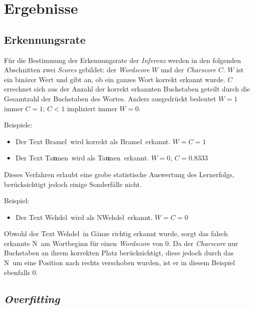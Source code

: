 \section{Ergebnisse}
\label{ergebnisse}

\subsection{Erkennungsrate}
\label{ergebnisse:erfolg}

Für die Bestimmung der Erkennungsrate der \textit{Inferenz} werden in den folgenden Abschnitten zwei \textit{Scores}
gebildet: der \textit{Wordscore} $W$ und der \textit{Charscore} $C$. $W$ ist ein binärer Wert und gibt an, ob ein ganzes
Wort korrekt erkannt wurde. $C$ errechnet sich aus der Anzahl der korrekt erkannten Buchstaben geteilt durch die
Gesamtzahl der Buchstaben des Wortes. Anders ausgedrückt bedeutet $W = 1$ immer $C = 1$; $C < 1$ impliziert immer
$W = 0$.

Beispiele:

\begin{itemize}
    \item Der Text \glqq Bramel\grqq\ wird korrekt als \glqq Bramel\grqq\ erkannt. $W = C = 1$
    \item Der Text \glqq Ta\textbf{\color{red}n}nen\grqq\ wird als \glqq Ta\textbf{\color{red}u}nen\grqq\ erkannt.
          $W = 0$, $C = 0.8333$
\end{itemize}

Dieses Verfahren erlaubt eine grobe statistische Auswertung des Lernerfolgs, berücksichtigt jedoch einige Sonderfälle
nicht.

Beispiel:

\begin{itemize}
    \item Der Text \glqq Wehdel\grqq\ wird als \glqq NWehdel\grqq\ erkannt. $W = C = 0$
\end{itemize}

Obwohl der Text \glqq Wehdel\grqq\ in Gänze richtig erkannt wurde, sorgt das falsch erkannte \glqq N\grqq\ am
Wortbeginn für einen \textit{Wordscore} von 0. Da der \textit{Charscore} nur Buchstaben an ihrem korrekten Platz
berücksichtigt, diese jedoch durch das \glqq N\grqq\ um eine Position nach rechts verschoben wurden, ist er in diesem
Beispiel ebenfalls 0.

\subsection{\textit{Overfitting}}
\label{ergebnisse:overfitting}

